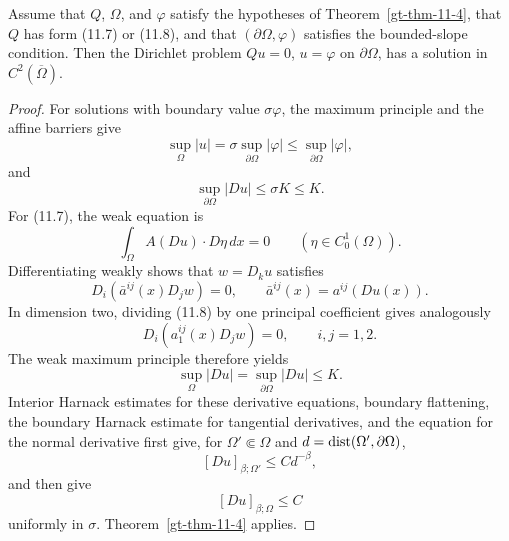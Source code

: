 \begin{theorem}
\label{gt-thm-11-5}
Assume that $Q$, $\Omega$, and $\varphi$ satisfy the hypotheses of
Theorem~\ref{gt-thm-11-4}, that $Q$ has form (11.7) or (11.8), and that
$(\partial\Omega,\varphi)$ satisfies the bounded-slope condition. Then the
Dirichlet problem $Qu=0$, $u=\varphi$ on $\partial\Omega$, has a solution in
$C^2(\overline\Omega)$.
\end{theorem}
\begin{proof}
\sketch For solutions with boundary value $\sigma\varphi$, the maximum
principle and the affine barriers give
\begin{equation}
\tag{11.9}
\sup_\Omega|u|=\sigma\sup_{\partial\Omega}|\varphi|
\leq\sup_{\partial\Omega}|\varphi|,
\end{equation}
and
\begin{equation}
\tag{11.10}
\sup_{\partial\Omega}|Du|\leq\sigma K\leq K.
\end{equation}
For (11.7), the weak equation is
\begin{equation}
\tag{11.11}
\int_\Omega A(Du)\cdot D\eta\,dx=0
\qquad(\eta\in C_0^1(\Omega)).
\end{equation}
Differentiating weakly shows that $w=D_ku$ satisfies
\begin{equation}
\tag{11.12}
D_i(\bar a^{ij}(x)D_jw)=0,
\qquad \bar a^{ij}(x)=a^{ij}(Du(x)).
\end{equation}
In dimension two, dividing (11.8) by one principal coefficient gives
analogously
\begin{equation}
\tag{11.14}
D_i(a_1^{ij}(x)D_jw)=0,
\qquad i,j=1,2.
\end{equation}
The weak maximum principle therefore yields
\begin{equation}
\tag{11.13}
\sup_\Omega|Du|=\sup_{\partial\Omega}|Du|\leq K.
\end{equation}
Interior Harnack estimates for these derivative equations, boundary
flattening, the boundary Harnack estimate for tangential derivatives, and the
equation for the normal derivative first give, for
$\Omega'\Subset\Omega$ and $d=\operatorname{dist}(\Omega',\partial\Omega)$,
\begin{equation}
\tag{11.15}
[Du]_{\beta;\Omega'}\leq Cd^{-\beta},
\end{equation}
and then give
\begin{equation}
\tag{11.16}
[Du]_{\beta;\Omega}\leq C
\end{equation}
uniformly in $\sigma$. Theorem~\ref{gt-thm-11-4} applies.
\end{proof}

